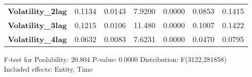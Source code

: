{\begin{table}[htbp]
\begin{center}
\begin{tabular}{lcccccc}
      \textbf{Volatility\_2lag}               &       0.1134       &       0.0143       &      7.9200     &      0.0000      &       0.0853      &       0.1415       \\
      \textbf{Volatility\_3lag}               &       0.1215       &       0.0106       &      11.480     &      0.0000      &       0.1007      &       0.1422       \\
      \textbf{Volatility\_4lag}               &       0.0632       &       0.0083       &      7.6231     &      0.0000      &       0.0470      &       0.0795       \\
      \bottomrule
    \end{tabular}
  \end{center}

  F-test for Poolability: 20.804 \newline
  P-value: 0.0000 \newline
  Distribution: F(3122,281858) \newline
  Included effects: Entity, Time
\end{table}
}
